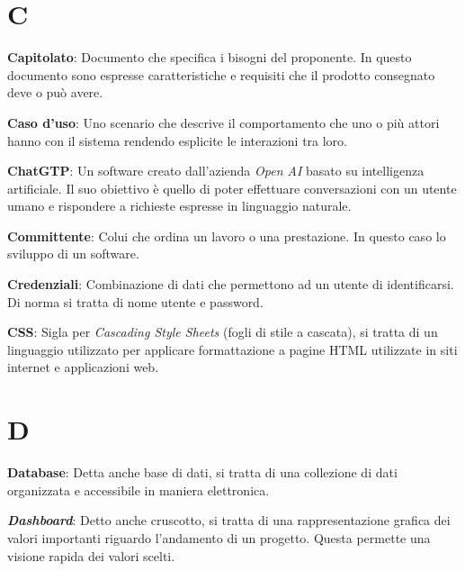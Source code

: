 \documentclass[5pt]{article}
\begin{document}
\section*{C}
\begin{flushleft}

\textbf{Capitolato}: Documento che specifica i bisogni del proponente. In questo documento sono espresse caratteristiche e requisiti che il prodotto consegnato deve o può avere.\newline

\textbf{Caso d'uso}: Uno scenario che descrive il comportamento che uno o più attori hanno con il sistema rendendo esplicite le interazioni tra loro.\newline

\textbf{ChatGTP}: Un software creato dall'azienda \textit{Open AI} basato su intelligenza artificiale. Il suo obiettivo è quello di poter effettuare conversazioni con un utente umano e rispondere a richieste espresse in linguaggio naturale.\newline

\textbf{Committente}: Colui che ordina un lavoro o una prestazione. In questo caso lo sviluppo di un software.\newline

\textbf{Credenziali}: Combinazione di dati che permettono ad un utente di identificarsi. Di norma si tratta di nome utente e password.\newline

\textbf{CSS}: Sigla per \textit{Cascading Style Sheets} (fogli di stile a cascata), si tratta di un linguaggio utilizzato per applicare formattazione a pagine HTML utilizzate in siti internet e applicazioni web.\\

\end{flushleft}

\pagebreak

\section*{D}
\begin{flushleft}

\textbf{Database}: Detta anche base di dati, si tratta di una collezione di dati organizzata e accessibile in maniera elettronica.\newline

\textbf{\textit{Dashboard}}: Detto anche cruscotto, si tratta di una rappresentazione grafica dei valori importanti riguardo l'andamento di un progetto. Questa permette una visione rapida dei valori scelti.\newline

\end{flushleft}
\end{document}

